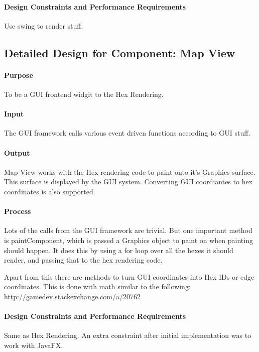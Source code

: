 \documentclass[12pt,a4paper,titlepage]{article}
\begin{document}
\paragraph{Design Constraints and Performance Requirements}
Use swing to render stuff.

\subsection{Detailed Design for Component: Map View}
\paragraph{Purpose} To be a GUI frontend widgit to the Hex Rendering.
\paragraph{Input}
The GUI framework calls various event driven functions according to GUI stuff.
\paragraph{Output}
Map View works with the Hex rendering code to paint onto it's Graphics surface.
This surface is displayed by the GUI system.
Converting GUI coordiantes to hex coordinates is also supported.
\paragraph{Process}
Lots of the calls from the GUI framework are trivial. But one important 
method is paintComponent, which is passed a Graphics object to paint on when
painting should happen. It does this by using a for loop over all the hexes
it should render, and passing that to the hex rendering code.

Apart from this there are methods to turn GUI coordinates into Hex IDs or 
edge coordinates. This is done with math similar to the following:
http://gamedev.stackexchange.com/a/20762
\paragraph{Design Constraints and Performance Requirements}
Same as Hex Rendering. An extra constraint after initial implementation was to
work with JavaFX.
\end{document}
